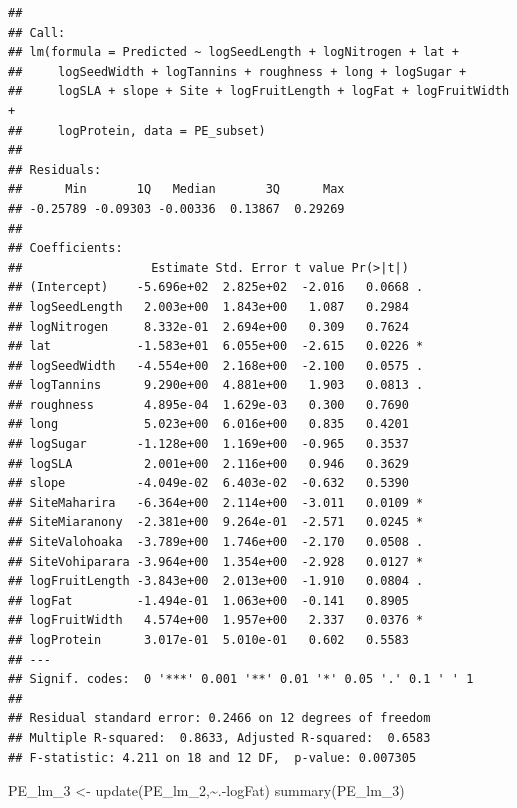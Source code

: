 \documentclass[
  12pt,
]{article}
\newenvironment{Shaded}{\begin{snugshade}}{\end{snugshade}}
\newcommand{\FunctionTok}[1]{\textcolor[rgb]{0.00,0.00,0.00}{#1}}
\newcommand{\NormalTok}[1]{#1}
\newcommand{\OtherTok}[1]{\textcolor[rgb]{0.56,0.35,0.01}{#1}}
\newcommand{\SpecialCharTok}[1]{\textcolor[rgb]{0.00,0.00,0.00}{#1}}
\begin{document}
\begin{verbatim}
## 
## Call:
## lm(formula = Predicted ~ logSeedLength + logNitrogen + lat + 
##     logSeedWidth + logTannins + roughness + long + logSugar + 
##     logSLA + slope + Site + logFruitLength + logFat + logFruitWidth + 
##     logProtein, data = PE_subset)
## 
## Residuals:
##      Min       1Q   Median       3Q      Max 
## -0.25789 -0.09303 -0.00336  0.13867  0.29269 
## 
## Coefficients:
##                  Estimate Std. Error t value Pr(>|t|)  
## (Intercept)    -5.696e+02  2.825e+02  -2.016   0.0668 .
## logSeedLength   2.003e+00  1.843e+00   1.087   0.2984  
## logNitrogen     8.332e-01  2.694e+00   0.309   0.7624  
## lat            -1.583e+01  6.055e+00  -2.615   0.0226 *
## logSeedWidth   -4.554e+00  2.168e+00  -2.100   0.0575 .
## logTannins      9.290e+00  4.881e+00   1.903   0.0813 .
## roughness       4.895e-04  1.629e-03   0.300   0.7690  
## long            5.023e+00  6.016e+00   0.835   0.4201  
## logSugar       -1.128e+00  1.169e+00  -0.965   0.3537  
## logSLA          2.001e+00  2.116e+00   0.946   0.3629  
## slope          -4.049e-02  6.403e-02  -0.632   0.5390  
## SiteMaharira   -6.364e+00  2.114e+00  -3.011   0.0109 *
## SiteMiaranony  -2.381e+00  9.264e-01  -2.571   0.0245 *
## SiteValohoaka  -3.789e+00  1.746e+00  -2.170   0.0508 .
## SiteVohiparara -3.964e+00  1.354e+00  -2.928   0.0127 *
## logFruitLength -3.843e+00  2.013e+00  -1.910   0.0804 .
## logFat         -1.494e-01  1.063e+00  -0.141   0.8905  
## logFruitWidth   4.574e+00  1.957e+00   2.337   0.0376 *
## logProtein      3.017e-01  5.010e-01   0.602   0.5583  
## ---
## Signif. codes:  0 '***' 0.001 '**' 0.01 '*' 0.05 '.' 0.1 ' ' 1
## 
## Residual standard error: 0.2466 on 12 degrees of freedom
## Multiple R-squared:  0.8633, Adjusted R-squared:  0.6583 
## F-statistic: 4.211 on 18 and 12 DF,  p-value: 0.007305
\end{verbatim}

\begin{Shaded}
\begin{Highlighting}[]
\NormalTok{PE\_lm\_3 }\OtherTok{\textless{}{-}} \FunctionTok{update}\NormalTok{(PE\_lm\_2,}\SpecialCharTok{\textasciitilde{}}\NormalTok{.}\SpecialCharTok{{-}}\NormalTok{logFat)}
\FunctionTok{summary}\NormalTok{(PE\_lm\_3)}
\end{Highlighting}
\end{Shaded}
\end{document}

